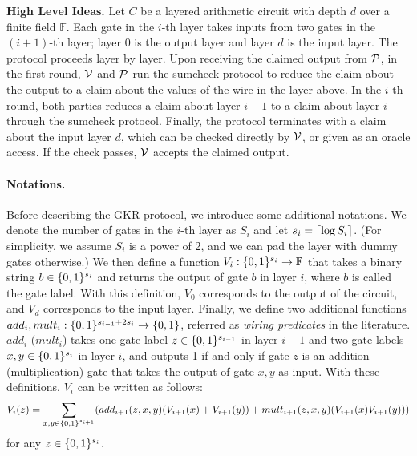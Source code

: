\smallskip\noindent\textbf{High Level Ideas.} Let $C$ be a layered arithmetic circuit with depth $d$ over a finite field $\mathbb{F}$. Each gate in the $i$-th layer takes inputs from two gates in the $(i+1)$-th layer; layer $0$ is the output layer and layer $d$ is the input layer. The protocol proceeds layer by layer. Upon receiving the claimed output from $\P$, in the first round, $\V$ and $\P$ run the sumcheck protocol to reduce the claim about the output to a claim about the values of the wire in the layer above. In the $i$-th round, both parties reduces a claim about layer $i-1$ to a claim about layer $i$ through the sumcheck protocol. Finally, the protocol terminates with a claim about the input layer $d$, which can be checked directly by $\V$, or given as an oracle access. If the check passes, $\V$ accepts the claimed output. 

\paragraph{Notations.} Before describing the GKR protocol, we introduce some additional notations. We denote the number of gates in the $i$-th layer as $S_i$ and let $s_i = \ceil{\log S_i}$. (For simplicity, we assume $S_i$ is a power of 2, and we can pad the layer with dummy gates otherwise.) We then define a function $V_i:\binary^{s_i}\rightarrow\mathbb{F}$ that takes a binary string $b\in\binary^{s_i}$ and returns the output of gate $b$ in layer $i$, where $b$ is called the gate label. With this definition, $V_0$ corresponds to the output of the circuit, and $V_d$ corresponds to the input layer. Finally, we define two additional functions $add_i, mult_i: \binary^{s_{i-1}+2s_i}\rightarrow\binary$, referred as \emph{wiring predicates} in the literature. $add_i$ ($mult_i$) takes one gate label $z\in\binary^{s_{i-1}}$ in layer $i-1$ and two gate labels $x,y\in\binary^{s_i}$ in layer $i$, and outputs 1 if and only if gate $z$ is an addition (multiplication) gate that takes the output of gate $x,y$ as input. With these definitions, $V_i$ can be written as follows:
\begin{equation}
	V_i(z)=\sum_{x, y \in\binary^{s_{i+1}}}(add_{i+1}(z,x,y)(V_{i+1}(x)+V_{i+1}(y))+mult_{i+1}(z,x,y)(V_{i+1}(x)V_{i+1}(y)))
\end{equation}
for any $z\in\binary^{s_i}$. 









